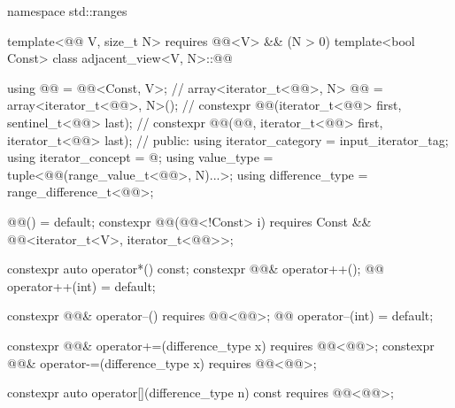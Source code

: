 %
\begin{codeblock}
namespace std::ranges {
  template<@@ V, size_t N>
    requires @@<V> && (N > 0)
  template<bool Const>
  class adjacent_view<V, N>::@@ {
    using @@ = @@<Const, V>;                                         // \expos
    array<iterator_t<@@>, N> @@ = array<iterator_t<@@>, N>();         // \expos
    constexpr @@(iterator_t<@@> first, sentinel_t<@@> last);          // \expos
    constexpr @@(@@, iterator_t<@@> first, iterator_t<@@> last);
                                                                                // \expos
  public:
    using iterator_category = input_iterator_tag;
    using iterator_concept  = @\seebelow@;
    using value_type = tuple<@@(range_value_t<@@>, N)...>;
    using difference_type = range_difference_t<@@>;

    @@() = default;
    constexpr @@(@@<!Const> i)
      requires Const && @@<iterator_t<V>, iterator_t<@@>>;

    constexpr auto operator*() const;
    constexpr @@& operator++();
    @@ operator++(int) = default;

    constexpr @@& operator--() requires @@<@@>;
    @@ operator--(int) = default;

    constexpr @@& operator+=(difference_type x)
      requires @@<@@>;
    constexpr @@& operator-=(difference_type x)
      requires @@<@@>;

    constexpr auto operator[](difference_type n) const
      requires @@<@@>;

}}
\end{codeblock}
